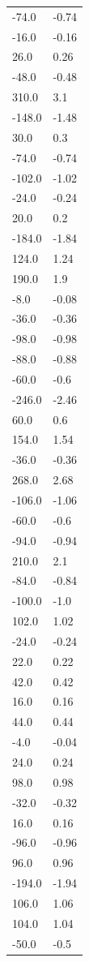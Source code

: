 \begin{longtable}{ll}
-74.0 & -0.74 \\
-16.0 & -0.16 \\
26.0 & 0.26 \\
-48.0 & -0.48 \\
310.0 & 3.1 \\
-148.0 & -1.48 \\
30.0 & 0.3 \\
-74.0 & -0.74 \\
-102.0 & -1.02 \\
-24.0 & -0.24 \\
20.0 & 0.2 \\
-184.0 & -1.84 \\
124.0 & 1.24 \\
190.0 & 1.9 \\
-8.0 & -0.08 \\
-36.0 & -0.36 \\
-98.0 & -0.98 \\
-88.0 & -0.88 \\
-60.0 & -0.6 \\
-246.0 & -2.46 \\
60.0 & 0.6 \\
154.0 & 1.54 \\
-36.0 & -0.36 \\
268.0 & 2.68 \\
-106.0 & -1.06 \\
-60.0 & -0.6 \\
-94.0 & -0.94 \\
210.0 & 2.1 \\
-84.0 & -0.84 \\
-100.0 & -1.0 \\
102.0 & 1.02 \\
-24.0 & -0.24 \\
22.0 & 0.22 \\
42.0 & 0.42 \\
16.0 & 0.16 \\
44.0 & 0.44 \\
-4.0 & -0.04 \\
24.0 & 0.24 \\
98.0 & 0.98 \\
-32.0 & -0.32 \\
16.0 & 0.16 \\
-96.0 & -0.96 \\
96.0 & 0.96 \\
-194.0 & -1.94 \\
106.0 & 1.06 \\
104.0 & 1.04 \\
-50.0 & -0.5 \\

\end{longtable}
